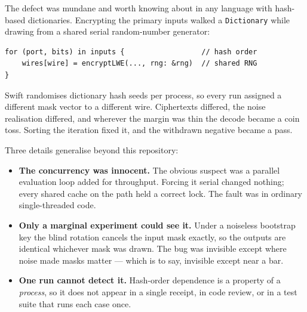 The defect was mundane and worth knowing about in any language with hash-based
dictionaries. Encrypting the primary inputs walked a \texttt{Dictionary} while
drawing from a shared serial random-number generator:

\begin{verbatim}
for (port, bits) in inputs {                  // hash order
    wires[wire] = encryptLWE(..., rng: &rng)  // shared RNG
}
\end{verbatim}

Swift randomises dictionary hash seeds per process, so every run assigned a
different mask vector to a different wire. Ciphertexts differed, the noise
realisation differed, and wherever the margin was thin the decode became a coin
toss. Sorting the iteration fixed it, and the withdrawn negative became a pass.

Three details generalise beyond this repository:

\begin{itemize}
  \item \textbf{The concurrency was innocent.} The obvious suspect was a
        parallel evaluation loop added for throughput. Forcing it serial changed
        nothing; every shared cache on the path held a correct lock. The fault
        was in ordinary single-threaded code.
  \item \textbf{Only a marginal experiment could see it.} Under a noiseless
        bootstrap key the blind rotation cancels the input mask exactly, so the
        outputs are identical whichever mask was drawn. The bug was invisible
        except where noise made masks matter --- which is to say, invisible
        except near a bar.
  \item \textbf{One run cannot detect it.} Hash-order dependence is a property
        of a \emph{process}, so it does not appear in a single receipt, in code
        review, or in a test suite that runs each case once.
\end{itemize}


